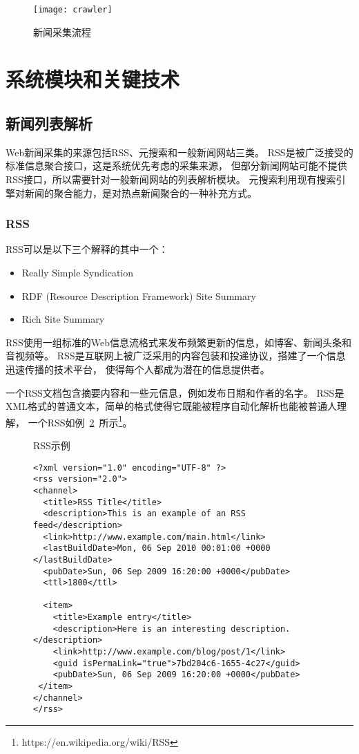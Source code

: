 \begin{figure}[htbp]
\centering
\texttt{[image: crawler]}
\caption{新闻采集流程}
\label{fig:crawler}
\end{figure}

\section{系统模块和关键技术}
\label{sec:system:module}

\subsection{新闻列表解析}
Web新闻采集的来源包括RSS、元搜索和一般新闻网站三类。
RSS是被广泛接受的标准信息聚合接口，这是系统优先考虑的采集来源，
但部分新闻网站可能不提供RSS接口，所以需要针对一般新闻网站的列表解析模块。
元搜索利用现有搜索引擎对新闻的聚合能力，是对热点新闻聚合的一种补充方式。

\subsubsection{RSS}
RSS可以是以下三个解释的其中一个：
\begin{itemize}
\item Really Simple Syndication
\item RDF (Resource Description Framework) Site Summary
\item Rich Site Summary
\end{itemize}

RSS使用一组标准的Web信息流格式来发布频繁更新的信息，如博客、新闻头条和音视频等。
RSS是互联网上被广泛采用的内容包装和投递协议，搭建了一个信息迅速传播的技术平台，
使得每个人都成为潜在的信息提供者。

一个RSS文档包含摘要内容和一些元信息，例如发布日期和作者的名字。
RSS是XML格式的普通文本，简单的格式使得它既能被程序自动化解析也能被普通人理解，
一个RSS如例~\ref{ex:rss}~所示\footnote{https://en.wikipedia.org/wiki/RSS}。

\begin{figure}[t]
\begin{example}
\label{ex:rss}
RSS示例
\end{example}
\begin{verbatim}
<?xml version="1.0" encoding="UTF-8" ?>
<rss version="2.0">
<channel>
  <title>RSS Title</title>
  <description>This is an example of an RSS feed</description>
  <link>http://www.example.com/main.html</link>
  <lastBuildDate>Mon, 06 Sep 2010 00:01:00 +0000 </lastBuildDate>
  <pubDate>Sun, 06 Sep 2009 16:20:00 +0000</pubDate>
  <ttl>1800</ttl>

  <item>
    <title>Example entry</title>
    <description>Here is an interesting description.</description>
    <link>http://www.example.com/blog/post/1</link>
    <guid isPermaLink="true">7bd204c6-1655-4c27</guid>
    <pubDate>Sun, 06 Sep 2009 16:20:00 +0000</pubDate>
 </item>
</channel>
</rss>
\end{verbatim}
\end{figure}

